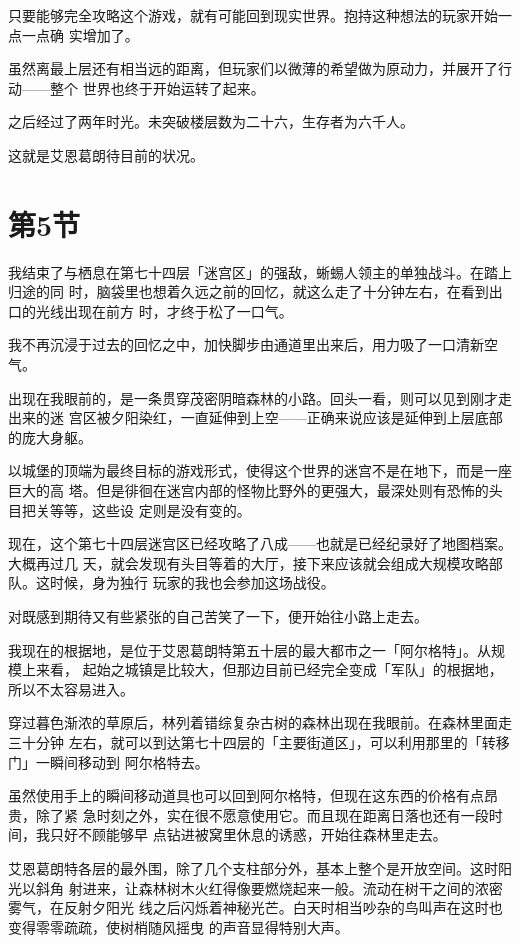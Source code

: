 \documentclass[11pt]{book}
\begin{document}
只要能够完全攻略这个游戏，就有可能回到现实世界。抱持这种想法的玩家开始一点一点确
实增加了。

虽然离最上层还有相当远的距离，但玩家们以微薄的希望做为原动力，并展开了行动——整个
世界也终于开始运转了起来。

之后经过了两年时光。未突破楼层数为二十六，生存者为六千人。

这就是艾恩葛朗待目前的状况。
\section{第5节}
\label{sec:org0f3e1ea}
我结束了与栖息在第七十四层「迷宫区」的强敌，蜥蜴人领主的单独战斗。在踏上归途的同
时，脑袋里也想着久远之前的回忆，就这么走了十分钟左右，在看到出口的光线出现在前方
时，才终于松了一口气。

我不再沉浸于过去的回忆之中，加快脚步由通道里出来后，用力吸了一口清新空气。

出现在我眼前的，是一条贯穿茂密阴暗森林的小路。回头一看，则可以见到刚才走出来的迷
宫区被夕阳染红，一直延伸到上空——正确来说应该是延伸到上层底部的庞大身躯。

以城堡的顶端为最终目标的游戏形式，使得这个世界的迷宫不是在地下，而是一座巨大的高
塔。但是徘徊在迷宫内部的怪物比野外的更强大，最深处则有恐怖的头目把关等等，这些设
定则是没有变的。

现在，这个第七十四层迷宫区已经攻略了八成——也就是已经纪录好了地图档案。大概再过几
天，就会发现有头目等着的大厅，接下来应该就会组成大规模攻略部队。这时候，身为独行
玩家的我也会参加这场战役。

对既感到期待又有些紧张的自己苦笑了一下，便开始往小路上走去。

我现在的根据地，是位于艾恩葛朗特第五十层的最大都市之一「阿尔格特」。从规模上来看，
起始之城镇是比较大，但那边目前已经完全变成「军队」的根据地，所以不太容易进入。

穿过暮色渐浓的草原后，林列着错综复杂古树的森林出现在我眼前。在森林里面走三十分钟
左右，就可以到达第七十四层的「主要街道区」，可以利用那里的「转移门」一瞬间移动到
阿尔格特去。

虽然使用手上的瞬间移动道具也可以回到阿尔格特，但现在这东西的价格有点昂贵，除了紧
急时刻之外，实在很不愿意使用它。而且现在距离日落也还有一段时间，我只好不顾能够早
点钻进被窝里休息的诱惑，开始往森林里走去。

艾恩葛朗特各层的最外围，除了几个支柱部分外，基本上整个是开放空间。这时阳光以斜角
射进来，让森林树木火红得像要燃烧起来一般。流动在树干之间的浓密雾气，在反射夕阳光
线之后闪烁着神秘光芒。白天时相当吵杂的鸟叫声在这时也变得零零疏疏，使树梢随风摇曳
的声音显得特别大声。
\end{document}
